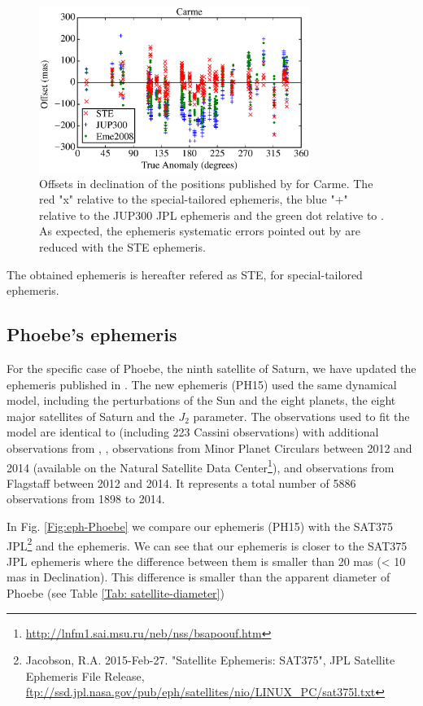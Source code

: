 \documentclass[useAMS,usenatbib]{mn2e}
\begin{document}
\begin{figure}
\includegraphics[width=8.8cm]{figures/Carme_ephemeris.eps} 
\caption{Offsets in declination of the positions published by \protect\cite{GomesJunior2015} for Carme. The red "x" relative to the special-tailored ephemeris, the blue "+" relative to the JUP300 JPL ephemeris and the green dot relative to \protect\cite{Emelyanov2008}. As expected, the ephemeris systematic errors pointed out by \protect\cite{GomesJunior2015} are reduced with the STE ephemeris. \label{Fig: JPL-STE}}
\end{figure}

The obtained ephemeris is hereafter refered as STE, for special-tailored ephemeris.

\subsection{Phoebe's ephemeris}

For the specific case of Phoebe, the ninth satellite of Saturn, we have updated the ephemeris published in \cite{Desmars2013}. The new ephemeris (PH15) used the same dynamical model, including the perturbations of the Sun and the eight planets, the eight major satellites of Saturn and the $J_2$ parameter. The observations used to fit the model are identical to \cite{Desmars2013} (including 223 Cassini observations) with additional observations from \cite{GomesJunior2015}, \cite{Peng2015}, observations from Minor Planet Circulars between 2012 and 2014 (available on the Natural Satellite Data Center\footnote{\url{http://lnfm1.sai.msu.ru/neb/nss/bsapoouf.htm}}), and observations from Flagstaff \citep{NOFS} between 2012 and 2014. It represents a total number of 5886 observations from 1898 to 2014.

In Fig. \ref{Fig:eph-Phoebe} we compare our ephemeris (PH15) with the SAT375 JPL\footnote{Jacobson, R.A. 2015-Feb-27. "Satellite Ephemeris: SAT375", JPL Satellite Ephemeris File Release, \url{ftp://ssd.jpl.nasa.gov/pub/eph/satellites/nio/LINUX_PC/sat375l.txt}} and the \cite{Emelyanov2007} ephemeris. We can see that our ephemeris is closer to the SAT375 JPL ephemeris where the difference between them is smaller than 20 mas (< 10 mas in Declination). This difference is smaller than the apparent diameter of Phoebe (see Table \ref{Tab: satellite-diameter})
\end{document}
